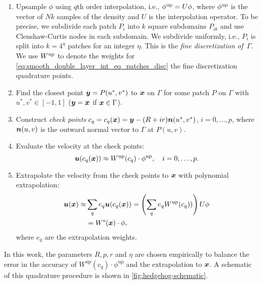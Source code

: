 \begin{enumerate}
  \item Upsample $\phi$ using $q$th order
    interpolation, i.e., $\phi^{\mathrm{up}} = U\phi$, where $\phi^{\mathrm{up}}$ is
    the vector of $Nk$ samples of the density and
    $U$ is the interpolation operator.
    To be precise, we subdivide each patch $P_i$ into $k$ square
    subdomains $P_{ik}$ and use Clenshaw-Curtis nodes in each subdomain.
    We subdivide uniformly, i.e., $P_i$ is split into
    $k=4^\eta$ patches for an integer $\eta$.
    This is the \textit{fine discretization of \,$\Gamma$}. 
    We use $W^{\mathrm{up}}$ to denote the weights for
    \cref{eq:smooth_double_layer_int_eq_patches_disc} the fine discretization quadrature points.
    
  \item Find the closest point ${\bm{y}} = P(u^*,v^*)$ to ${\bm{x}}$ on $\Gamma$ for some
  patch $P$ on $\Gamma$ with $u^*,v^*\in [-1,1]$ (${\bm{y}} = {\bm{x}}$ if ${\bm{x}} \in \Gamma$). 
\item Construct \emph{check points} $c_q =c_q({\bm{x}}) = {\bm{y}} -(R + ir) {\bm{n}}(u^*,v^*) $,
  $i=0,\ldots, p$, where ${\bm{n}}(u,v)$ is the outward normal vector to $\Gamma$ at $P(u,v)$. 
  \item Evaluate the velocity at the check points:
    \begin{equation}
      {\bm{u}}(c_q({\bm{x}})) \approx W^{\mathrm{up}}(c_q)\cdot\phi^{\text{up}},\quad i=0,\ldots, p.
      \label{eq:quad_check_points}
    \end{equation}
  \item Extrapolate the velocity from the check points to ${\bm{x}}$ with  polynomial extrapolation: 
    \begin{align}
      {\bm{u}}({\bm{x}}) \approx& \sum_q e_q {\bm{u}}(c_q({\bm{x}})) = \left(\sum_q e_q W^{\mathrm{up}}(c_q))\right) U \phi \label{eq:sing-quad}\\
      &= W^{\mathrm{s}}({\bm{x}}) \cdot \phi,
    \end{align}      
where $e_q$ are the extrapolation weights.
\end{enumerate}
In this work, the parameters $R,p,r$ and $\eta$ are chosen empirically
to balance the
error in the accuracy of $W^{\text{up}}(c_q) \cdot
\phi^{\text{up}}$ and the extrapolation to
${\bm{x}}$. A schematic of this quadrature procedure is shown in
\cref{fig:hedgehog-schematic}.

